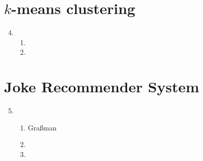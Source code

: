 \documentclass[11pt,letterpaper]{article}
\theoremstyle{definition}
\theoremstyle{plain}
\numberwithin{equation}{section}
\numberwithin{figure}{section}
\begin{document}
\section{\texorpdfstring{$k$-means clustering}{k-means clustering}}
\begin{enumerate}
\setcounter{enumi}{3}
	\item \begin{enumerate}
		\item
		\item 
	\end{enumerate}
\end{enumerate}
















\section{Joke Recommender System}
\begin{enumerate}
\setcounter{enumi}{4}
	\item \begin{enumerate}
		\item Gra{\ss}man
		\item 
		\item 
	\end{enumerate}
\end{enumerate}
\end{document}
